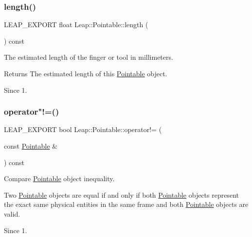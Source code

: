 \subsubsection{\texorpdfstring{length()}{length()}}
{\footnotesize\ttfamily L\+E\+A\+P\+\_\+\+E\+X\+P\+O\+RT float Leap\+::\+Pointable\+::length (\begin{DoxyParamCaption}{ }\end{DoxyParamCaption}) const}

The estimated length of the finger or tool in millimeters.


\begin{DoxyCodeInclude}
\end{DoxyCodeInclude}


\begin{DoxyReturn}{Returns}
The estimated length of this \hyperlink{class_leap_1_1_pointable}{Pointable} object. 
\end{DoxyReturn}
\begin{DoxySince}{Since}
1. 
\end{DoxySince}
\mbox{\label{class_leap_1_1_pointable_a8c5f5867979827b4649259a687c564c4}} 
\subsubsection{\texorpdfstring{operator"!=()}{operator!=()}}
{\footnotesize\ttfamily L\+E\+A\+P\+\_\+\+E\+X\+P\+O\+RT bool Leap\+::\+Pointable\+::operator!= (\begin{DoxyParamCaption}\item[{const \hyperlink{class_leap_1_1_pointable}{Pointable} \&}]{ }\end{DoxyParamCaption}) const}

Compare \hyperlink{class_leap_1_1_pointable}{Pointable} object inequality.


\begin{DoxyCodeInclude}
\end{DoxyCodeInclude}


Two \hyperlink{class_leap_1_1_pointable}{Pointable} objects are equal if and only if both \hyperlink{class_leap_1_1_pointable}{Pointable} objects represent the exact same physical entities in the same frame and both \hyperlink{class_leap_1_1_pointable}{Pointable} objects are valid. \begin{DoxySince}{Since}
1. 
\end{DoxySince}
\mbox{\label{class_leap_1_1_pointable_a62b124c14981bbe4cff9961b0367feed}} 
